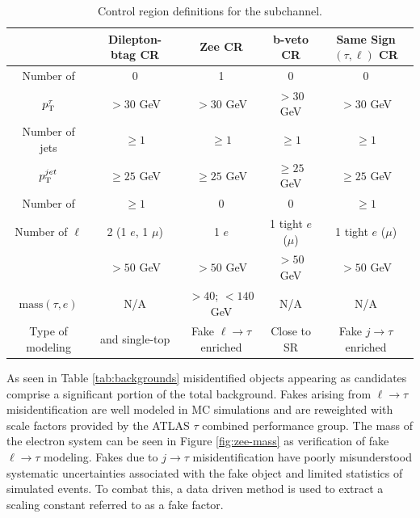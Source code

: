 		\begin{table}[!thp]
			\begin{tabular}{| c | c | c | c | c |} \hline
																& Dilepton-btag CR 				& Zee CR 												& b-veto CR 					& Same Sign $(\tau,\ell)$ CR 						 							\\ \hline
				Number of \tauhad 			& 0 											& 1 														& 0 									& 0 																		\\ \hline
				$p_{\text{T}}^{\tau}$ 						& $ > 30$ GeV 						& $ > 30$ GeV 									& $ > 30$ GeV 				& $ > 30$ GeV 													\\ \hline
				Number of jets 					& $\geq 1$ 								& $\geq 1$ 											& $\geq 1$ 						& $\geq 1$ 															\\ \hline
				$p_{\text{T}}^{jet}$ 						& $\geq 25$ GeV 					& $\geq 25$ GeV 								& $\geq 25$ GeV 			& $\geq 25$ GeV 												\\ \hline
				Number of \bjets				& $\geq 1$ 								& 0 														& 0 									& $\geq 1$ 															\\ \hline
				Number of $\ell$ 				& 2 (1 $e$, 1 $\mu$)			& 1 $e$													& 1 tight $e$ ($\mu$)	& 1 tight $e$ ($\mu$)										\\ \hline
				\Etm 										& $> 50$ GeV 							& $> 50$ GeV 										& $> 50$ GeV 					& $> 50$ GeV 														\\ \hline
				$\mathrm{mass}(\tau,e)$	& N/A 										& $> 40$; $< 140$ GeV 					& N/A 								& N/A 																	\\ \hline
				Type of modeling 				& \ttbar and single-top 	& Fake $\ell \to \tau$ enriched	& Close to SR 				& Fake $j \to \tau$ enriched 						\\ \hline
			\end{tabular}
			\caption{Control region definitions for the \taulep subchannel.}
			\label{tab:taulep-control-regions}
		\end{table}



		As seen in Table \ref{tab:backgrounds} misidentified objects appearing as \tauhad candidates comprise a significant portion of the total background. Fakes arising from $\ell \to \tau$ misidentification are well modeled in \gls{MC} simulations and are reweighted with scale factors provided by the ATLAS $\tau$ combined performance group. The mass of the \tauhad electron system can be seen in Figure \ref{fig:zee-mass} as verification of fake $\ell \to \tau$ modeling. Fakes due to $j \to \tau$ misidentification have poorly misunderstood systematic uncertainties associated with the fake \tauhad object and limited statistics of simulated events. To combat this, a data driven method is used to extract a scaling constant referred to as a fake factor.


